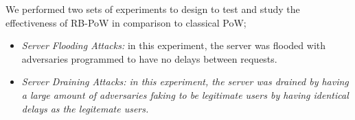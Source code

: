 \begin{comment}
  \begin{table}[H]
    \centering
    \tiny
    \begin{tabular}{lcccccccc} \toprule
      \multicolumn{1}{c}{Prot. model} & \multicolumn{3}{c}{Attackers} & \multicolumn{2}{c}{Legitimate users} & \multicolumn{2}{c}{Mobile devices} \\
      \multicolumn{1}{c}{} & \multicolumn{1}{c}{Pop. size} & \multicolumn{1}{c}{Solving} & \multicolumn{1}{c}{Service} & \multicolumn{1}{c}{Solving} & \multicolumn{1}{c}{Service} & \multicolumn{1}{c}{Solving} & \multicolumn{1}{c}{Service}  \\ \toprule
      None & 120x7  & 0.57$\pm$0.02 &  19861.19$\pm$375.23 & 0.48$\pm$0.05 & 19965.45$\pm$1286.18 & 16.87$\pm$7.64 & 20800.60$\pm$3202.62     \\ \bottomrule
    \end{tabular}

    \caption{No protection}\label{tab:noprot}

  \end{table}
\end{comment}

We performed two sets of experiments to design to test and study the effectiveness of RB-PoW in comparison to classical PoW;
\begin{itemize}
\item \emph{Server Flooding Attacks:} in this experiment, the server was flooded with adversaries programmed to have no delays between requests.

\item \emph{Server Draining Attacks: in this experiment, the server was drained by having a large amount of adversaries faking to be legitimate users by having identical delays as the legitemate users.} 
\end{itemize}

